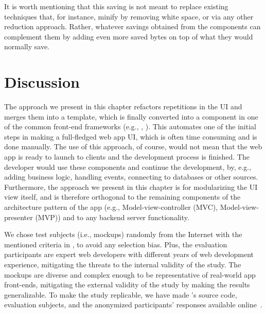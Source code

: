 It is worth mentioning that this saving is not meant to replace existing techniques
that, for instance, minify \html by removing white space, or via any other reduction approach.
Rather, whatever savings obtained from the components can complement them by adding even more saved bytes on top of what they would normally save.


\section{Discussion}
 The approach we present in this chapter refactors repetitions in the UI and merges them into a template, which is finally converted into a component in one of the common front-end frameworks (e.g., \react, \angular). This automates one of the initial steps in making a full-fledged web app UI, which is often time consuming and is done manually. The use of this approach, of course, would not mean that the web app is ready to launch to clients and the development process is finished. The developer would use these components and continue the development, by, e.g., adding business logic, handling events, connecting to databases or other sources. Furthermore, the approach we present in this chapter is for modularizing the UI view itself, and is therefore orthogonal to the remaining components of the architecture pattern of the app (e.g., Model-view-controller (MVC), Model-view-presenter (MVP)) and to any backend server functionality.

We chose test subjects (i.e., mockups) randomly from the Internet
with the mentioned criteria in ,
to avoid any selection bias.
Plus, the evaluation participants are expert web developers
with different years of web development experience,
mitigating the threats to the internal validity of the study.
The mockups are diverse and complex enough
to be representative of real-world app front-ends,
mitigating the external validity of the study by making the results generalizable.
To make the study replicable, we have made 
\toolname's source code, evaluation subjects, and the anonymized participants' responses available online~\cite{tool-and-data}.